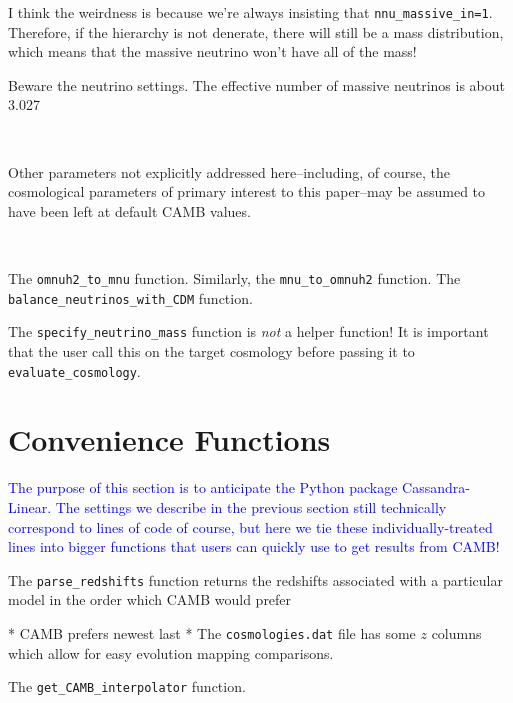 I think the weirdness is because we're always
insisting that \verb|nnu_massive_in=1|. Therefore,
if the hierarchy is not denerate, there will still
be a mass distribution, which means that the 
massive neutrino won't have all of the mass!

Beware the neutrino settings. The effective number of massive neutrinos is about 3.027

\

Other parameters not explicitly addressed here--including, of course, the
cosmological parameters of primary interest to this paper--may be assumed to 
have been left at default CAMB values.

\


The \verb|omnuh2_to_mnu| function. Similarly, the \verb|mnu_to_omnuh2|
function. The \verb|balance_neutrinos_with_CDM| function.


The \verb|specify_neutrino_mass| function is \textit{not} a helper function!
It is important that the user call this on the target cosmology before passing
it to \verb|evaluate_cosmology|.

\section{Convenience Functions}


\textcolor{blue}{The purpose of this section is to anticipate the Python
package Cassandra-Linear. The settings we describe in the previous section
still technically correspond to lines of code of course, but here we tie these
individually-treated lines into bigger functions that users can quickly use to
get results from CAMB!}



The \verb|parse_redshifts| function returns the redshifts associated with a
particular model in the order which CAMB would prefer

* CAMB prefers newest last
* The \verb|cosmologies.dat| file has some $z$ columns which allow for easy
evolution mapping comparisons. %
	

The \verb|get_CAMB_interpolator| function.

